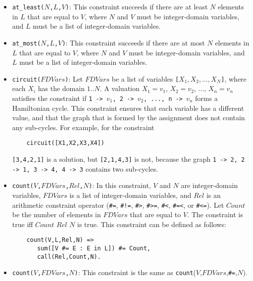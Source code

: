 \begin{itemize}
\item \texttt{at\_least($N$,$L$,$V$)}: This constraint succeeds if there are at least $N$ elements in $L$ that are equal to $V$, where $N$ and $V$ must be integer-domain variables, and $L$ must be a list of integer-domain variables.

\item \texttt{at\_most($N$,$L$,$V$)}: This constraint succeeds if there are at most $N$ elements in $L$ that are equal to $V$, where $N$ and $V$ must be integer-domain variables, and $L$ must be a list of integer-domain variables.

\item \texttt{circuit($FDVars$)}: Let $FDVars$ be a list of variables \texttt{[$X_1,X_2,\ldots,X_N$]}, where each \texttt{$X_i$} has the domain $1..N$. A valuation $X_1 = v_1$, $X_2 = v_2$, $\ldots$, $X_n = v_n$ satisfies the constraint if \texttt{1 -> $v_1$, 2 -> $v_2$, ..., n -> $v_n$} forms a Hamiltonian cycle. This constraint ensures that each variable has a different value, and that the graph that is formed by the assignment does not contain any sub-cycles. For example, for the constraint 
\begin{verbatim}
    circuit([X1,X2,X3,X4])
\end{verbatim}
\texttt{[3,4,2,1]} is a solution, but \texttt{[2,1,4,3]} is not, because the graph \texttt{1 -> 2, 2 -> 1, 3 -> 4, 4 -> 3} contains two sub-cycles.
\item \texttt{count($V$,$FDVars$,$Rel$,$N$)}:  In this constraint, $V$ and $N$ are integer-domain variables, $FDVars$ is a list of integer-domain variables, and $Rel$ is an arithmetic constraint operator (\verb+#=+,  \verb+#!=+,  \verb+#>+,  \verb+#>=+,  \verb+#<+,  \verb+#=<+, or \verb+#<=+). Let $Count$ be the number of elements in $FDVars$ that are equal to $V$. The constraint is true iff $Count$ $Rel$ $N$ is true. This constraint can be defined as follows:
\begin{verbatim}
    count(V,L,Rel,N) =>
       sum([V #= E : E in L]) #= Count,
       call(Rel,Count,N).
\end{verbatim}
\item \texttt{count($V$,$FDVars$,$N$)}: This constraint is the same as \texttt{count}($V$,$FDVars$,\verb+#=+,$N$).


\end{itemize}
